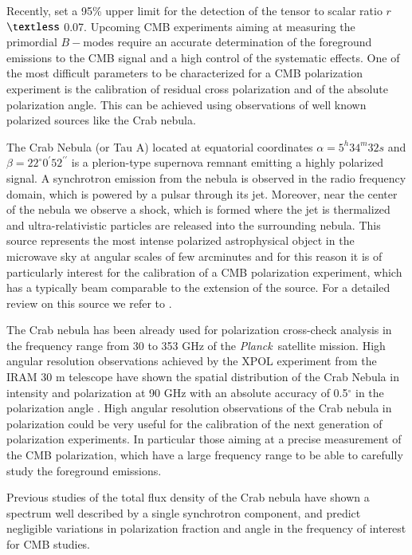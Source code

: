 \documentclass[twocolumn,traditabstract]{aa}
\def\Planck{\textit{Planck}}
\begin{document}
Recently, \citet{bicepplanck2015,bicep2016} set a 95\% upper limit for the detection of the tensor to scalar ratio $r$ $\textless$ 0.07.
Upcoming CMB experiments aiming at measuring the primordial $B-$modes require an accurate determination of the foreground emissions to the CMB signal and a high control of the systematic effects. One of the most difficult parameters to be characterized for a CMB polarization experiment is the calibration of residual cross polarization and of the absolute polarization angle. This can be achieved using observations of well known polarized sources like the Crab nebula.

The Crab Nebula (or Tau A) located at equatorial coordinates $\alpha = 5^h34^m32s$ and $\beta = 22^{\circ}0^{\prime}52^{\prime\prime}$ is a plerion-type supernova remnant emitting a highly polarized signal.
A synchrotron emission from the nebula is observed in the radio frequency domain, which is powered by a pulsar through its jet. 
Moreover, near the center of the nebula we observe a shock, which is formed where the jet is thermalized and ultra-relativistic particles are released into the surrounding nebula. This source represents the most intense polarized astrophysical object in the microwave sky at angular scales of few arcminutes and for this reason it is of particularly interest  for the calibration of a CMB polarization experiment, which has a typically beam comparable to the extension of the source.
For a detailed review on this source we refer to \citet{2008ARA&A..46..127H}.

The Crab nebula has been already used for polarization cross-check analysis in the frequency range from 30 to 353 GHz of the \Planck\ satellite mission. High angular resolution observations achieved by the XPOL experiment \citep{thum2008} from the IRAM 30 m telescope have shown the spatial distribution of the Crab Nebula in intensity and polarization at 90 GHz with an absolute accuracy of 0.5$^{\circ}$ in the polarization angle \citep{aumont2010}. 
High angular resolution observations of the Crab nebula in polarization could be very useful for the calibration of the next generation of polarization experiments. In particular those aiming at a precise measurement of the CMB polarization, which have a large frequency range to be able to carefully study the foreground emissions. 

Previous studies \citep{macias2010} of the total flux density of the Crab nebula have shown a spectrum well described by a single synchrotron component, and predict negligible variations in polarization fraction and angle in the frequency of interest for CMB studies.
 
\end{document}
